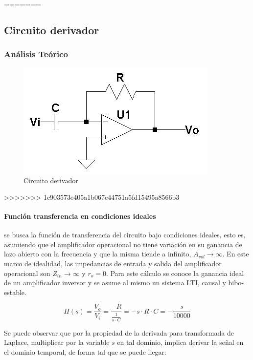 =======

	\subsection{Circuito derivador}
 
\subsubsection{An\'alisis Te\'orico}

\begin{figure}[H]
	\centering
	\includegraphics[scale=0.8]{Recursos/Derivador/Circuito_derivador.png}
	\caption{Circuito derivador}
	\label{fig:circuito_derivador}
\end{figure}

>>>>>>> 1c903573e405a1b067e44751a5fd15495a8566b3
\paragraph*{Funci\'on transferencia en condiciones ideales}se busca la funci\'on de transferencia del circuito bajo condiciones ideales, esto es, asumiendo que el amplificador operacional no tiene variaci\'on en su ganancia de lazo abierto con la frecuencia y que la misma tiende a infinito, $A_{vol} \to \infty$. En este marco de idealidad, las impedancias de entrada y salida del amplificador operacional son $Z_{in} \to \infty$ y $r_o = 0$. Para este c\'alculo se conoce la ganancia ideal de un amplificador inversor y se asume al mismo un sistema LTI, causal y bibo-estable.

\begin{equation}
	H(s) = \frac{V_o}{V_i} = \frac{-R}{ \frac{1}{s \cdot C}} = -s \cdot R  \cdot C
	= -\frac{s}{10000}
	\label{eq:derivador_transfer_ideal}
\end{equation}

Se puede observar que por la propiedad de la derivada para transformada de Laplace, multiplicar por la variable $s$ en tal dominio, implica derivar la se\~nal en el dominio temporal, de forma tal que se puede llegar:

